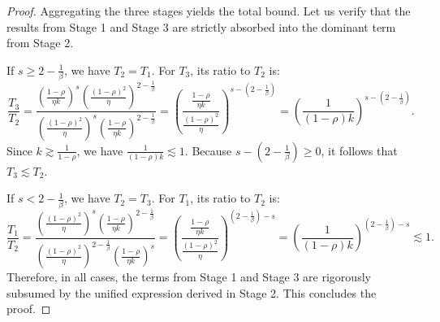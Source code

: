 \begin{proof}
Aggregating the three stages yields the total bound. Let us verify that the results from Stage 1 and Stage 3 are strictly absorbed into the dominant term from Stage 2.

If $s \ge 2-\frac{1}{\beta}$, we have $T_2 = T_1$. For $T_3$, its ratio to $T_2$ is:
\begin{equation*}
    \frac{T_3}{T_2} = \frac{\left(\frac{1-\rho}{\eta k}\right)^s \left(\frac{(1-\rho)^2}{\eta}\right)^{2-\frac{1}{\beta}}}{\left(\frac{(1-\rho)^2}{\eta}\right)^s \left(\frac{1-\rho}{\eta k}\right)^{2-\frac{1}{\beta}}} = \left(\frac{\frac{1-\rho}{\eta k}}{\frac{(1-\rho)^2}{\eta}}\right)^{s-\left(2-\frac{1}{\beta}\right)} = \left(\frac{1}{(1-\rho)k}\right)^{s-\left(2-\frac{1}{\beta}\right)}.
\end{equation*}
Since $k \gtrsim \frac{1}{1-\rho}$, we have $\frac{1}{(1-\rho)k} \lesssim 1$. Because $s - (2-\frac{1}{\beta}) \ge 0$, it follows that $T_3 \lesssim T_2$.

If $s < 2-\frac{1}{\beta}$, we have $T_2 = T_3$. For $T_1$, its ratio to $T_2$ is:
\begin{equation*}
    \frac{T_1}{T_2} = \frac{\left(\frac{(1-\rho)^2}{\eta}\right)^s \left(\frac{1-\rho}{\eta k}\right)^{2-\frac{1}{\beta}}}{\left(\frac{(1-\rho)^2}{\eta}\right)^{2-\frac{1}{\beta}} \left(\frac{1-\rho}{\eta k}\right)^s} = \left(\frac{\frac{1-\rho}{\eta k}}{\frac{(1-\rho)^2}{\eta}}\right)^{\left(2-\frac{1}{\beta}\right)-s} = \left(\frac{1}{(1-\rho)k}\right)^{\left(2-\frac{1}{\beta}\right)-s} \lesssim 1.
\end{equation*}
Therefore, in all cases, the terms from Stage 1 and Stage 3 are rigorously subsumed by the unified expression derived in Stage 2. This concludes the proof.
\end{proof}

